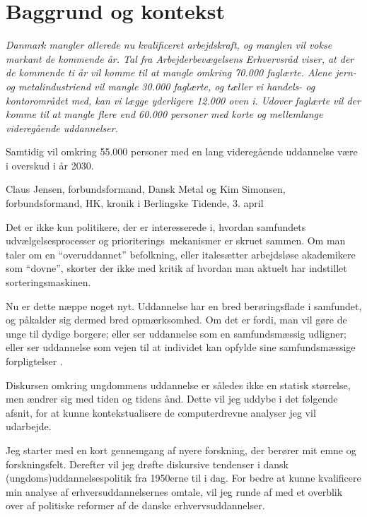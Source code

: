 \part{Baggrund og kontekst}\label{part:baggrund}
\epigraph{\itshape
Danmark mangler allerede nu kvalificeret arbejdskraft, og manglen vil vokse markant de kommende år. Tal fra Arbejderbevægelsens Erhvervsråd viser, at der de kommende ti år vil komme til at mangle omkring 70.000 faglærte. Alene jern- og metalindustriend vil mangle 30.000 faglærte, og tæller vi handels- og kontorområdet med, kan vi lægge yderligere 12.000 oven i. Udover faglærte vil der komme til at mangle flere end 60.000 personer med korte og mellemlange videregående uddannelser.

Samtidig vil omkring 55.000 personer med en lang videregående uddannelse være i overskud i år 2030.
}
{Claus Jensen, forbundsformand, Dansk Metal og Kim Simonsen, forbundsformand, HK, kronik i Berlingske Tidende, 3. april \citeyear{simonsenLadOsGore2016}}

Det er ikke kun politikere, der er interesserede i, hvordan samfundets udvælgelsesprocesser og prioriterings\ mekanismer er skruet sammen.
Om man taler om en “overuddannet” befolkning, eller italesætter arbejdsløse akademikere som “dovne”, skorter der ikke med kritik af hvordan man aktuelt har indstillet sorteringsmaskinen.

Nu er dette næppe noget nyt.
Uddannelse har en bred berøringsflade i samfundet, og påkalder sig dermed bred opmærksomhed.
Om det er fordi, man vil gøre de unge til dydige borgere; eller ser uddannelse som en samfundsmæssig udligner; eller ser uddannelse som vejen til at individet kan opfylde sine samfundsmæssige forpligtelser \cite[s. 9]{juulDiskurserOmUngdom2013}.

Diskursen omkring ungdommens uddannelse er således ikke en statisk størrelse, men ændrer sig med tiden og tidens ånd.
Dette vil jeg uddybe i det følgende afsnit, for at kunne kontekstualisere de computerdrevne analyser jeg vil udarbejde.

Jeg starter med en kort gennemgang af nyere forskning, der berører mit emne og forskningsfelt.
Derefter vil jeg drøfte diskursive tendenser i dansk (ungdoms)uddannelsespolitik fra 1950erne til i dag.
For bedre at kunne kvalificere min analyse af erhversuddannelsernes omtale, vil jeg runde af med et overblik over af politiske reformer af de danske erhvervsuddannelser.

